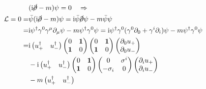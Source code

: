 \documentclass{article}
\begin{document}
$$
\begin{aligned}
& (\mathrm{i}\cancel{\partial}-m)\psi=0\quad\Rightarrow                                                                                                                                              \\
\mathcal{L}=0=                                                          & \bar{\psi}(\mathrm{i}\cancel{\partial}-m)\psi=\mathrm{i}\bar{\psi}\cancel{\partial}\psi-m\bar{\psi}\psi                                                                                            \\
=                                                                       & \mathrm{i}\psi^{\dagger}\gamma^0\gamma^\mu\partial_{\mu}\psi-m\psi^{\dagger}\gamma^0\psi=\mathrm{i}\psi^{\dagger}\gamma^0(\gamma^0\partial_0+\gamma^i\partial_{i})\psi-m\psi^{\dagger}\gamma^0\psi \\
=                                                                       & \mathrm{i}
\begin{pmatrix}
  u_+^{\dagger} & u_-^{\dagger}
\end{pmatrix}
\begin{pmatrix}
  0 & \bf{1} \\\bf{1} & 0
\end{pmatrix}
\begin{pmatrix}
  0 & \bf{1} \\\bf{1} & 0
\end{pmatrix}
\begin{pmatrix}
  \partial_0u_+ \\\partial_0u_-
\end{pmatrix}
\\ & -\mathrm{i}
\begin{pmatrix}
  u_+^{\dagger} & u_-^{\dagger}
\end{pmatrix}
\begin{pmatrix}
  0 & \bf{1} \\\bf{1} & 0
\end{pmatrix}
\begin{pmatrix}
  0 & \sigma^i \\-\sigma_i & 0
\end{pmatrix}
\begin{pmatrix}
  \partial_iu_+ \\\partial_i u_-
\end{pmatrix}
\\ & -m
\begin{pmatrix}
  u_+^{\dagger} & u_-^{\dagger}
\end{pmatrix}

\end{aligned}$$
\end{document}
